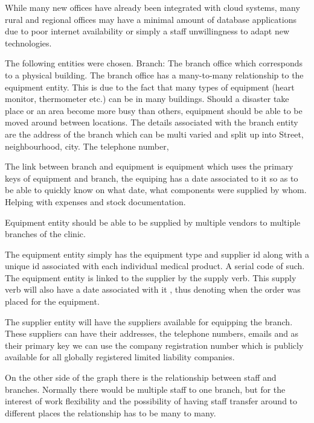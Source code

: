 \documentclass{article}
\begin{document}
While many new offices have already been integrated with cloud systems, many rural and regional offices may have a minimal amount of database applications due to poor internet availability or simply a staff unwillingness to adapt new technologies.






The following entities were chosen.
Branch: The branch office which corresponds to a physical building. 
The branch office has a many-to-many relationship to the equipment entity. This is due to the fact that many types of equipment (heart monitor, thermometer etc.) can be in many buildings. Should a disaster take place or an area become more busy than others, equipment should be able to be moved around between locations.
The details associated with the branch entity are the address of the branch which can be multi varied and split up into Street, neighbourhood, city. The telephone number, 








The link between branch and equipment is equipment which uses the primary keys of equipment and branch, the equiping has a date associated to it so as to be able to quickly know on what date, what components were supplied by whom. Helping with expenses and stock documentation.








Equipment entity should be able to be supplied by multiple vendors to multiple branches of the clinic. 


The equipment entity simply has the equipment type and supplier id along with a unique id associated with each individual medical product. A serial code of such.
The equipment  entity is linked to the supplier by the supply verb.
This supply verb will also have a date associated with it , thus denoting when the order was placed for the equipment.


The supplier entity will have the suppliers available for equipping the branch. These suppliers can have their addresses, the telephone numbers, emails and as their primary key we can use the company registration number which is publicly available for all globally registered limited liability companies.






On the other side of the graph there is the relationship between staff and branches. Normally there would be multiple staff to one branch, but for the interest of work flexibility and the possibility of having staff transfer around to different places the relationship has to be many to many.
\end{document}

